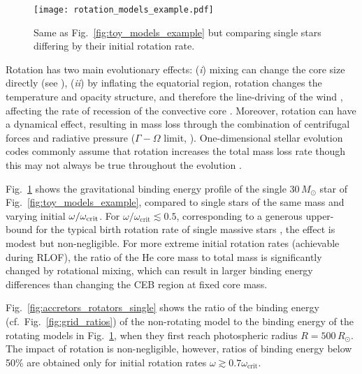 \documentclass[twocolumn,twocolappendix,trackchanges]{aastex63}
\DeclareRobustCommand{\Figref}[1]{Fig.~\ref{#1}}
\begin{document}
\begin{figure}[htbp]
  \centering
  \texttt{[image: rotation\_models\_example.pdf]}
  \caption{Same as \Figref{fig:toy_models_example} but comparing
    single stars differing by their initial rotation rate.}
  \label{fig:rotation_models_example}
\end{figure}

Rotation has two main evolutionary effects: (\emph{i}) mixing can change the core
size directly (see \citealt{heger:2000, maeder:00}), (\emph{ii}) by
inflating the equatorial region, rotation changes the temperature and
opacity structure, and therefore the line-driving of the wind
\cite[e.g.,][]{muller:2014, gagnier:2019}, affecting the
rate of recession of the convective core \citep[e.g.,][]{renzo:2017,
  renzo:2020ppi_conv}. Moreover, rotation can have a dynamical effect,
resulting in mass loss through the combination of centrifugal forces
and radiative pressure ($\Gamma-\Omega$ limit, \citealt{langer:1998}).
One-dimensional stellar evolution codes commonly assume that rotation
increases the total mass loss rate \citep[e.g.,][]{langer:1998,
  heger:2000} though this may not always be true throughout the
evolution \citep[e.g.,][]{gagnier:2019}.

\Figref{fig:rotation_models_example} shows the gravitational binding
energy profile of the single $30\,M_\odot$ star of
\Figref{fig:toy_models_example}, compared to single stars of the same
mass and varying initial $\omega/\omega_{\rm crit}$.
For $\omega/\omega_\mathrm{crit}\lesssim 0.5$, corresponding to a
generous upper-bound for the typical birth rotation rate of single
massive stars \citep[e.g.,][]{ramirez-agudelo:2015}, the effect is
modest but non-negligible. For more extreme initial rotation rates
(achievable during RLOF), the ratio of
the He core mass to total mass is significantly changed by rotational
mixing, which can result in larger binding energy differences than
changing the CEB region at fixed core mass.

\Figref{fig:accretors_rotators_single} shows the ratio of the binding energy
(cf.~\Figref{fig:grid_ratios}) of the non-rotating model to the
binding energy of the rotating models in
\Figref{fig:rotation_models_example}, when they first reach
photospheric radius $R=500\,R_\odot$. The impact of rotation is
non-negligible, however, ratios of binding energy below 50\% are
obtained only for initial rotation rates
$\omega \gtrsim 0.7\omega_\mathrm{crit}$.
\end{document}
